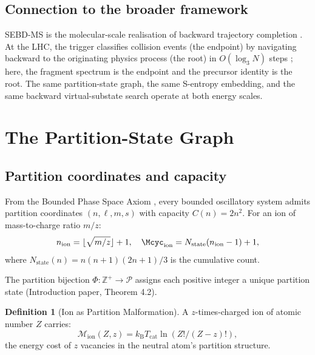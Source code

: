 \documentclass[twocolumn,10pt,a4paper]{article}
\theoremstyle{thmstyle}
\theoremstyle{definition}
\newtheorem{definition}[theorem]{Definition}
\theoremstyle{remark}
\newcommand{\Zp}{\mathbb{Z}^{+}}
\newcommand{\kB}{k_{\mathrm{B}}}
\newcommand{\Parts}{\mathcal{P}}
\newcommand{\PhiMap}{\varPhi}
\newcommand{\Mop}{\mathcal{M}}
\newcommand{\Tcat}{T_{\mathrm{cat}}}
\begin{document}
\subsection{Connection to the broader framework}

SEBD-MS is the molecular-scale realisation of backward trajectory completion
\citep{companion:trajectory}.  At the LHC, the trigger classifies collision
events (the endpoint) by navigating backward to the originating physics
process (the root) in $O(\log_3 N)$ steps \citep{companion:planck}; here,
the fragment spectrum is the endpoint and the precursor identity is the root.
The same partition-state graph, the same S-entropy embedding, and the same
backward virtual-substate search operate at both energy scales.

\section{The Partition-State Graph}
\label{sec:graph}

\subsection{Partition coordinates and capacity}

From the Bounded Phase Space Axiom \citep{companion:math}, every bounded
oscillatory system admits partition coordinates $(n,\ell,m,s)$ with capacity
$C(n) = 2n^2$.  For an ion of mass-to-charge ratio $m/z$:
\begin{equation}
n_\text{ion} = \lfloor\sqrt{m/z}\rfloor + 1,
\quad
\Mcyc_\text{ion} = N_\text{state}(n_\text{ion}-1) + 1,
\label{eq:mz_to_n}
\end{equation}
where $N_\text{state}(n) = n(n+1)(2n+1)/3$ is the cumulative count.

The partition bijection $\PhiMap: \Zp \to \Parts$ assigns each positive
integer a unique partition state (Introduction paper, Theorem 4.2).

\begin{definition}[Ion as Partition Malformation]
A $z$-times-charged ion of atomic number $Z$ carries:
\begin{equation}
\Mop_\text{ion}(Z,z) = \kB\Tcat\ln(Z!/(Z-z)!),
\label{eq:malformation}
\end{equation}
the energy cost of $z$ vacancies in the neutral atom's partition structure.
\end{definition}
\end{document}

